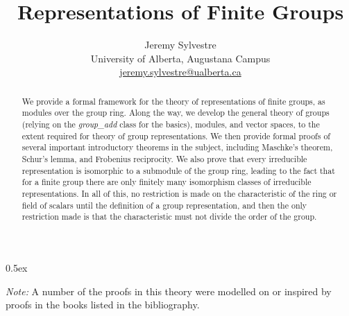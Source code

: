 \documentclass[11pt,a4paper]{article}
\begin{document}
\title{Representations of Finite Groups}
\author{Jeremy Sylvestre \\ University of Alberta, Augustana Campus \\ \href{mailto:jsylvest@ualberta.ca}{\url{jeremy.sylvestre@ualberta.ca}}}

\maketitle

\begin{abstract}
We provide a formal framework for the theory of representations of finite groups, as modules over the group ring. Along the way, we develop the general theory of groups (relying on the \textit{group{\_}add} class for the basics), modules, and vector spaces, to the extent required for theory of group representations. We then provide formal proofs of several important introductory theorems in the subject, including Maschke's theorem, Schur's lemma, and Frobenius reciprocity. We also prove that every irreducible representation is isomorphic to a submodule of the group ring, leading to the fact that for a finite group there are only finitely many isomorphism classes of irreducible representations. In all of this, no restriction is made on the characteristic of the ring or field of scalars until the definition of a group representation, and then the only restriction made is that the characteristic must not divide the order of the group.
\end{abstract}

\tableofcontents

\parindent 0pt\parskip 0.5ex

\vspace*{32pt}
\textit{Note:} A number of the proofs in this theory were modelled on or inspired by proofs in the books listed in the bibliography.
\vspace*{32pt}



\nocite{*}


\end{document}
